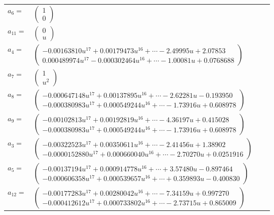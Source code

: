 \documentclass[1p]{elsarticle_modified}
\theoremstyle{definition}
\begin{document}
\begin{tabular}{m{7pt} m{180pt} m{7pt} m{180pt} }
\flushright $a_{6}=$&$\begin{pmatrix}1\\0\end{pmatrix}$ \\
\flushright $a_{11}=$&$\begin{pmatrix}0\\u\end{pmatrix}$ \\
\flushright $a_{4}=$&$\begin{pmatrix}-0.00163810 u^{17}+0.00179473 u^{16}+\cdots-2.49995 u+2.07853\\0.000489974 u^{17}-0.000302464 u^{16}+\cdots-1.00081 u+0.0768688\end{pmatrix}$ \\
\flushright $a_{7}=$&$\begin{pmatrix}1\\u^2\end{pmatrix}$ \\
\flushright $a_{8}=$&$\begin{pmatrix}-0.000647148 u^{17}+0.00137895 u^{16}+\cdots-2.62281 u-0.193950\\-0.000380983 u^{17}+0.000549244 u^{16}+\cdots-1.73916 u+0.608978\end{pmatrix}$ \\
\flushright $a_{9}=$&$\begin{pmatrix}-0.00102813 u^{17}+0.00192819 u^{16}+\cdots-4.36197 u+0.415028\\-0.000380983 u^{17}+0.000549244 u^{16}+\cdots-1.73916 u+0.608978\end{pmatrix}$ \\
\flushright $a_{3}=$&$\begin{pmatrix}-0.00322523 u^{17}+0.00350611 u^{16}+\cdots-2.41456 u+1.38902\\-0.0000152880 u^{17}+0.000660040 u^{16}+\cdots-2.70270 u+0.0251916\end{pmatrix}$ \\
\flushright $a_{5}=$&$\begin{pmatrix}-0.00137194 u^{17}+0.000914778 u^{16}+\cdots+3.57480 u-0.897464\\-0.000606358 u^{17}+0.000539657 u^{16}+\cdots+0.359893 u-0.400830\end{pmatrix}$ \\
\flushright $a_{12}=$&$\begin{pmatrix}-0.00177283 u^{17}+0.00280042 u^{16}+\cdots-7.34159 u+0.997270\\-0.000412612 u^{17}+0.000733802 u^{16}+\cdots-2.73715 u+0.865009\end{pmatrix}$ \\

\end{tabular}
\end{document}
